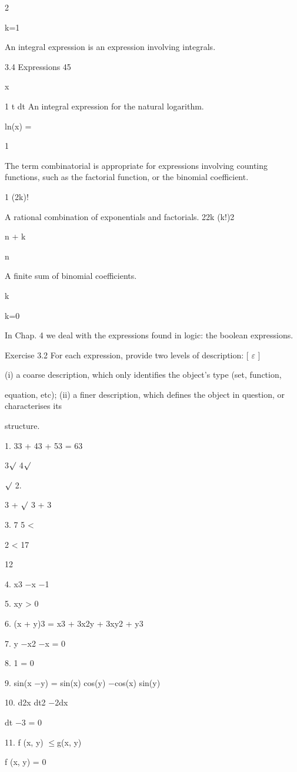 \documentclass[11pt]{article}
\theoremstyle{plain}
\theoremstyle{definition}
\begin{document}
2

k=1

An integral expression is an expression involving integrals.

3.4 Expressions 45

x

1 t dt An integral expression for the natural logarithm.

ln(x) =

1

The term combinatorial is appropriate for expressions involving counting functions, such as the factorial function, or the binomial coefficient.

1 (2k)!

A rational combination of exponentials and factorials. 22k (k!)2

n + k

n

A finite sum of binomial coefficients.

k

k=0

In Chap. 4 we deal with the expressions found in logic: the boolean expressions.

Exercise 3.2 For each expression, provide two levels of description: [ $\varepsilon$ ]

(i) a coarse description, which only identifies the object's type (set, function,

equation, etc); (ii) a finer description, which defines the object in question, or characterises its

structure.

1. 33 + 43 + 53 = 63

3$\surd$ 4$\surd$

$\surd$ 2.

3 + $\surd$ 3 + 3

3. 7 5 <

2 < 17

12

4. x3 $-$x $-$1

5. xy > 0

6. (x + y)3 = x3 + 3x2y + 3xy2 + y3

7. y $-$x2 $-$x = 0

8. 1 = 0

9. sin(x $-$y) = sin(x) cos(y) $-$cos(x) sin(y)

10. d2x dt2 $-$2dx

dt $-$3 = 0

11. f (x, y) $\leq$g(x, y)

f (x, y) = 0
\end{document}
